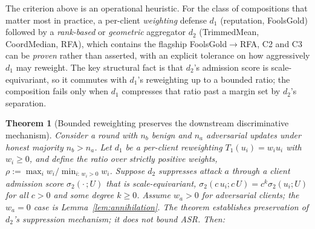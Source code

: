 \documentclass{article}
\newtheorem{theorem}{Theorem}
\begin{document}
The criterion above is an operational heuristic. For the class of compositions that matter most in practice, a per-client \emph{weighting} defense $d_1$ (reputation, FoolsGold) followed by a \emph{rank-based} or \emph{geometric} aggregator $d_2$ (TrimmedMean, CoordMedian, RFA), which contains the flagship FoolsGold$\to$RFA, C2 and C3 can be \emph{proven} rather than asserted, with an explicit tolerance on how aggressively $d_1$ may reweight. The key structural fact is that $d_2$'s admission score is scale-equivariant, so it commutes with $d_1$'s reweighting up to a bounded ratio; the composition fails only when $d_1$ compresses that ratio past a margin set by $d_2$'s separation.

\begin{theorem}[Bounded reweighting preserves the downstream discriminative mechanism]
\label{thm:bounded_reweight}
Consider a round with $n_b$ benign and $n_a$ adversarial updates under honest majority $n_b > n_a$. Let $d_1$ be a per-client reweighting $T_1(u_i) = w_i u_i$ with $w_i \geq 0$, and define the ratio over \emph{strictly positive} weights, $\rho := \max_i w_i / \min_{i:\,w_i>0} w_i$. Suppose $d_2$ suppresses attack $a$ through a client admission score $\sigma_2(\cdot\,;U)$ that is scale-equivariant, $\sigma_2(c\,u_i; c\,U) = c^{k}\sigma_2(u_i;U)$ for all $c>0$ and some degree $k\ge 0$. Assume $w_a > 0$ for adversarial clients; the $w_a = 0$ case is Lemma~\ref{lem:annihilation}. The theorem establishes preservation of $d_2$'s suppression \emph{mechanism}; it does not bound ASR. Then:
\begin{enumerate}[noitemsep,topsep=2pt]

\end{enumerate}
\end{theorem}
\end{document}
